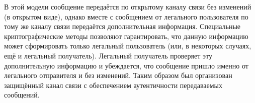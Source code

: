 В этой модели сообщение передаётся по открытому каналу связи без изменений (в открытом виде), однако вместе с сообщением от легального пользователя по тому же каналу связи передаётся дополнительная информация. Специальные криптографические методы позволяют гарантировать, что данную информацию может сформировать только легальный пользователь (или, в некоторых случаях, ещё и легальный получатель). Легальный получатель проверяет эту дополнительную информацию и убеждается, что сообщение пришло именно от легального отправителя и без изменений. Таким образом был организован защищённый канал связи с обеспечением аутентичности передаваемых сообщений. 

